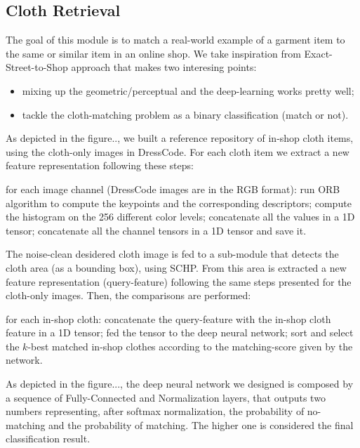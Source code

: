 \subsection{Cloth Retrieval}

The goal of this module is to match a real-world example of a garment item to the same or similar item in an online shop. We take inspiration from Exact-Street-to-Shop approach that makes two interesing points:
\begin{itemize}
	\item mixing up the geometric/perceptual and the deep-learning works pretty well;
	\item tackle the cloth-matching problem as a binary classification (match or not).
\end{itemize}

As depicted in the figure.., we built a reference repository of in-shop cloth items, using the cloth-only images in DressCode. For each cloth item we extract a new feature representation following these steps:
\begin{outline}
 \1 for each image channel (DressCode images are in the RGB format):
   \2 run ORB algorithm to compute the keypoints and the corresponding descriptors;
   \2 compute the histogram on the 256 different color levels;
   \2 concatenate all the values in a 1D tensor;
 \1 concatenate all the channel tensors in a 1D tensor and save it.
\end{outline}

The noise-clean desidered cloth image is fed to a sub-module that detects the cloth area (as a bounding box), using SCHP. From this area is extracted a new feature representation (query-feature) following the same steps presented for the cloth-only images. Then, the comparisons are performed:
\begin{outline}
\1 for each in-shop cloth:
	\2 concatenate the query-feature with the in-shop cloth feature in a 1D tensor;
	\2 fed the tensor to the deep neural network;
\1 sort and select the $k$-best matched in-shop clothes according to the matching-score given by the network. 
\end{outline}
As depicted in the figure..., the deep neural network we designed is composed by a sequence of Fully-Connected and Normalization layers, that outputs two numbers representing, after softmax normalization, the probability of no-matching and the probability of matching. The higher one is considered the final classification result.

